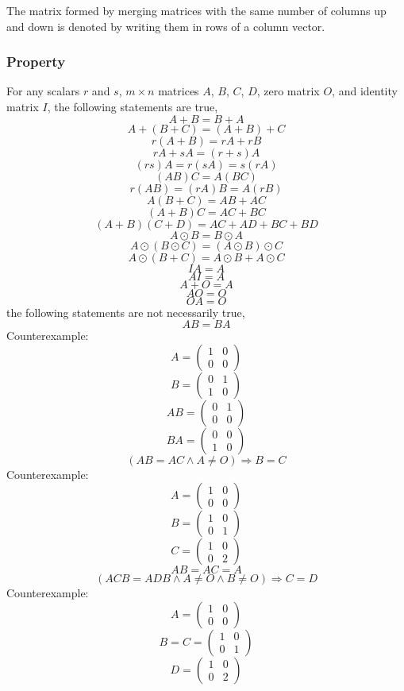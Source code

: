 \documentclass[a4paper,12pt]{report}
\begin{document}
The matrix formed by merging matrices with the same number of columns up and down is denoted by writing them in rows of a column vector.
\subsubsection{Property}
For any scalars $r$ and $s$, $m\times n$ matrices $A$, $B$, $C$, $D$, zero matrix $O$, and identity matrix $I$, the following statements are true,
\[A+B=B+A\]
\[A+(B+C)=(A+B)+C\]
\[r(A+B)=rA+rB\]
\[rA+sA=(r+s)A\]
\[(rs)A=r(sA)=s(rA)\]
\[(AB)C=A(BC)\]
\[r(AB)=(rA)B=A(rB)\]
\[A(B+C)=AB+AC\]
\[(A+B)C=AC+BC\]
\[(A+B)(C+D)=AC+AD+BC+BD\]
\[A\odot B=B\odot A\]
\[A\odot(B\odot C)=(A\odot B)\odot C\]
\[A\odot(B+C)=A\odot B+A\odot C\]
\[IA=A\]
\[AI=A\]
\[A+O=A\]
\[AO=O\]
\[OA=O\]
the following statements are not necessarily true,
\[AB=BA\]
\bpr
Counterexample:
\[A=\begin{pmatrix}1&0\\0&0\end{pmatrix}\]
\[B=\begin{pmatrix}0&1\\1&0\end{pmatrix}\]
\[AB=\begin{pmatrix}0&1\\0&0\end{pmatrix}\]
\[BA=\begin{pmatrix}0&0\\1&0\end{pmatrix}\]
\epr
\[(AB=AC\land A\neq O)\Rightarrow B=C\]
\bpr
Counterexample:
\[A=\begin{pmatrix}1&0\\0&0\end{pmatrix}\]
\[B=\begin{pmatrix}1&0\\0&1\end{pmatrix}\]
\[C=\begin{pmatrix}1&0\\0&2\end{pmatrix}\]
\[AB=AC=A\]
\epr
\[(ACB=ADB\land A\neq O\land B\neq O)\Rightarrow C=D\]
\bpr
Counterexample:
\[A=\begin{pmatrix}1&0\\0&0\end{pmatrix}\]
\[B=C=\begin{pmatrix}1&0\\0&1\end{pmatrix}\]
\[D=\begin{pmatrix}1&0\\0&2\end{pmatrix}\]
\end{document}
